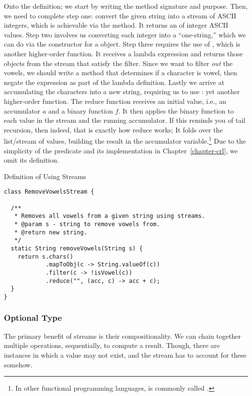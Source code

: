 Onto the definition; we start by writing the method signature and purpose. Then, we need to complete step one: convert the given string into a stream of ASCII integers, which is achievable via the  method. It returns an  of integer ASCII values. Step two involves us converting each integer into a ``one-string,'' which we can do via the constructor for a  object. Step three requires the use of , which is another higher-order function. It receives a lambda expression and returns those objects from the stream that satisfy the filter. Since we want to filter \emph{out} the vowels, we should write a method that determines if a character is vowel, then negate the expression as part of the lambda definition. Lastly we arrive at accumulating the characters into a new string, requiring us to use : yet another higher-order function. The reduce function receives an initial value, i.e., an accumulator $a$ and a binary function $f$. It then applies the binary function to each value in the stream and the running accumulator. If this reminds you of tail recursion, then indeed, that is exactly how reduce works; It folds over the list/stream of values, building the result in the accumulator variable.\footnote{In other functional programming languages,  is commonly called .} Due to the simplicity of the  predicate and its implementation in Chapter~\ref{chapter-crl}, we omit its definition.

\begin{cl}[]{Definition of  Using Streams}
\begin{lstlisting}[language=MyJava]
class RemoveVowelsStream {

  /**
   * Removes all vowels from a given string using streams.
   * @param s - string to remove vowels from.
   * @return new string.
   */
  static String removeVowels(String s) {
    return s.chars()
            .mapToObj(c -> String.valueOf(c))
            .filter(c -> !isVowel(c))
            .reduce("", (acc, c) -> acc + c);
  }
}
\end{lstlisting}
\end{cl}

\subsubsection*{Optional Type}
The primary benefit of streams is their compositionality. We can chain together multiple operations, sequentially, to compute a result. Though, there are instances in which a value may not exist, and the stream has to account for these somehow.

